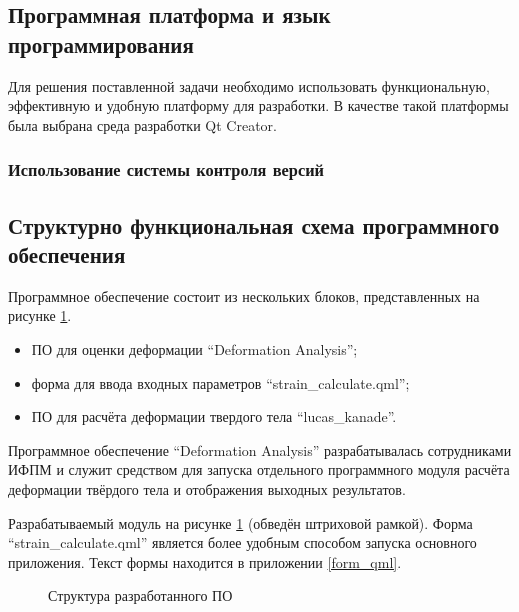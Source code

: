 \subsection {Программная платформа и язык программирования}
Для решения поставленной задачи необходимо использовать функциональную, эффективную и удобную платформу для разработки. В качестве такой платформы была выбрана среда разработки Qt Creator.

\subsubsection {Использование системы контроля версий}

\subsection{Структурно функциональная схема программного обеспечения}%

Программное обеспечение состоит из нескольких блоков, представленных на рисунке \ref{pic:shema_PO}.

\begin{itemize}
\item ПО для оценки деформации ``Deformation Analysis'';
\item форма для ввода входных параметров ``strain\_calculate.qml'';
\item ПО для расчёта деформации твердого тела ``lucas\_kanade''.
\end{itemize}

Программное обеспечение ``Deformation Analysis'' разрабатывалась сотрудниками ИФПМ и служит средством для запуска отдельного программного модуля расчёта деформации твёрдого тела и отображения выходных результатов. 

Разрабатываемый модуль на рисунке \ref{pic:shema_PO} (обведён штриховой рамкой). Форма ``strain\_calculate.qml'' является более удобным способом запуска основного приложения. Текст формы находится в приложении \ref{form_qml}.

\begin{figure}[h!]
\caption{Структура разработанного ПО}
\label{pic:shema_PO}
\end{figure}

